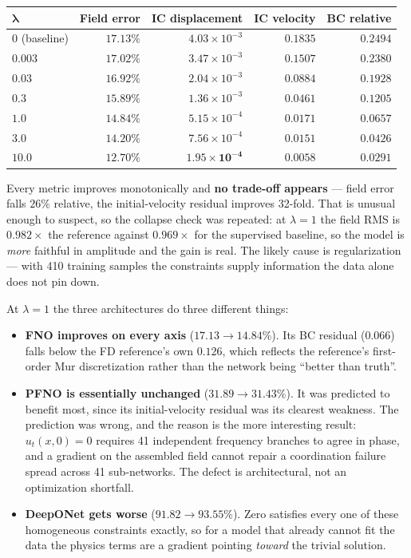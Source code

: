 \documentclass[11pt,a4paper]{article}
\begin{document}
\begin{center}
\small
\begin{tabular}{lrrrr}
\toprule
$\boldsymbol{\lambda}$ & \textbf{Field error} & \textbf{IC displacement} & \textbf{IC velocity} & \textbf{BC relative}\\
\midrule
$0$ (baseline) & $17.13\%$ & $4.03\!\times\!10^{-3}$ & $0.1835$ & $0.2494$\\
$0.003$        & $17.02\%$ & $3.47\!\times\!10^{-3}$ & $0.1507$ & $0.2380$\\
$0.03$         & $16.92\%$ & $2.04\!\times\!10^{-3}$ & $0.0884$ & $0.1928$\\
$0.3$          & $15.89\%$ & $1.36\!\times\!10^{-3}$ & $0.0461$ & $0.1205$\\
$1.0$          & $14.84\%$ & $5.15\!\times\!10^{-4}$ & $0.0171$ & $0.0657$\\
$3.0$          & $14.20\%$ & $7.56\!\times\!10^{-4}$ & $0.0151$ & $0.0426$\\
$\mathbf{10.0}$ & $\mathbf{12.70\%}$ & $\mathbf{1.95\!\times\!10^{-4}}$ & $\mathbf{0.0058}$ & $\mathbf{0.0291}$\\
\bottomrule
\end{tabular}
\end{center}

Every metric improves monotonically and \textbf{no trade-off appears} --- field
error falls $26\%$ relative, the initial-velocity residual improves 32-fold.
That is unusual enough to suspect, so the collapse check was repeated: at
$\lambda=1$ the field RMS is $0.982\times$ the reference against $0.969\times$
for the supervised baseline, so the model is \emph{more} faithful in amplitude
and the gain is real. The likely cause is regularization --- with 410 training
samples the constraints supply information the data alone does not pin down.

At $\lambda=1$ the three architectures do three different things:

\begin{itemize}[leftmargin=*,itemsep=3pt]
\item \textbf{FNO improves on every axis} ($17.13\to14.84\%$). Its BC residual
($0.066$) falls below the FD reference's own $0.126$, which reflects the
reference's first-order Mur discretization rather than the network being
``better than truth''.
\item \textbf{PFNO is essentially unchanged} ($31.89\to31.43\%$). It was
predicted to benefit most, since its initial-velocity residual was its clearest
weakness. The prediction was wrong, and the reason is the more interesting
result: $u_t(x,0)=0$ requires 41 independent frequency branches to agree in
phase, and a gradient on the assembled field cannot repair a coordination
failure spread across 41 sub-networks. The defect is architectural, not an
optimization shortfall.
\item \textbf{DeepONet gets worse} ($91.82\to93.55\%$). Zero satisfies every one
of these homogeneous constraints exactly, so for a model that already cannot fit
the data the physics terms are a gradient pointing \emph{toward} the trivial
solution.
\end{itemize}
\end{document}
